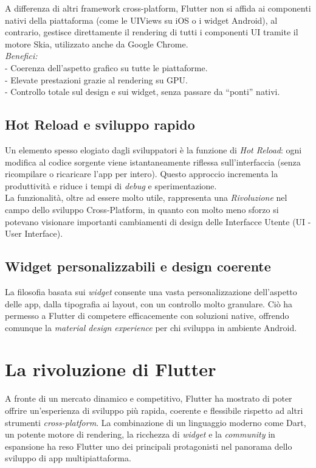 \documentclass[14pt]{extbook}
\begin{document}
A differenza di altri framework cross-platform, Flutter non si affida ai componenti nativi della piattaforma (come le UIViews su iOS o i widget Android), al contrario, gestisce direttamente il rendering di tutti i componenti UI tramite il motore Skia, utilizzato anche da Google Chrome.\\

\textit{Benefici:}\\

- Coerenza dell’aspetto grafico su tutte le piattaforme.\\
- Elevate prestazioni grazie al rendering su GPU.\\
- Controllo totale sul design e sui widget, senza passare da “ponti” nativi.\\

\subsection{Hot Reload e sviluppo rapido}
Un elemento spesso elogiato dagli sviluppatori è la funzione di \emph{Hot Reload}: ogni modifica al codice sorgente viene istantaneamente riflessa sull'interfaccia (senza ricompilare o ricaricare l'app per intero). Questo approccio incrementa la produttività e riduce i tempi di \emph{debug} e sperimentazione.\\

La funzionalità, oltre ad essere molto utile, rappresenta una \emph{Rivoluzione} nel campo dello sviluppo Cross-Platform, in quanto con molto meno sforzo si potevano visionare importanti cambiamenti di design delle Interfacce Utente (UI -  User Interface).\\

\subsection{Widget personalizzabili e design coerente}
La filosofia basata sui \emph{widget} consente una vasta personalizzazione dell'aspetto delle app, dalla tipografia ai layout, con un controllo molto granulare. Ciò ha permesso a Flutter di competere efficacemente con soluzioni native, offrendo comunque la \emph{material design experience} per chi sviluppa in ambiente Android.\\

\section{La rivoluzione di Flutter}
A fronte di un mercato dinamico e competitivo, Flutter ha mostrato di poter offrire un'esperienza di sviluppo più rapida, coerente e flessibile rispetto ad altri strumenti \emph{cross-platform}. La combinazione di un linguaggio moderno come Dart, un potente motore di rendering, la ricchezza di \emph{widget} e la \emph{community} in espansione ha reso Flutter uno dei principali protagonisti nel panorama dello sviluppo di app multipiattaforma.\\
\end{document}
